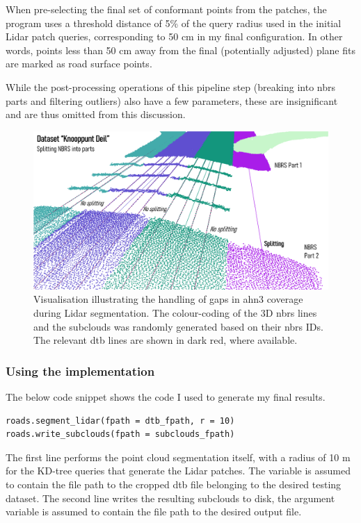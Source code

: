 When pre-selecting the final set of conformant points from the patches, the program uses a threshold distance of 5\% of the query radius used in the initial Lidar patch queries, corresponding to 50 cm in my final configuration. In other words, points less than 50 cm away from the final (potentially adjusted) plane fits are marked as road surface points.

While the post-processing operations of this pipeline step (breaking into \ac{nbrs} parts and filtering outliers) also have a few parameters, these are insignificant and are thus omitted from this discussion.

\begin{figure}
    \centering
    \includegraphics[width=0.92\linewidth]{final_report/figs/lidarsegmentation2.png}
    \caption[Render illustrating the handling of AHN3 gaps during Lidar segmentation]{Visualisation illustrating the handling of gaps in \ac{ahn3} coverage during Lidar segmentation. The colour-coding of the 3D \ac{nbrs} lines and the subclouds was randomly generated based on their \ac{nbrs} IDs. The relevant \ac{dtb} lines are shown in dark red, where available.}
    \label{fig:lidarsegmentation2}
\end{figure}

\subsubsection{Using the implementation}

The below code snippet shows the code I used to generate my final results.

\begin{verbatim}
roads.segment_lidar(fpath = dtb_fpath, r = 10)
roads.write_subclouds(fpath = subclouds_fpath)
\end{verbatim}

The first line performs the point cloud segmentation itself, with a radius of 10 m for the KD-tree queries that generate the Lidar patches. The variable  is assumed to contain the file path to the cropped \ac{dtb} file belonging to the desired testing dataset. The second line writes the resulting subclouds to disk, the argument variable is assumed to contain the file path to the desired output file.

